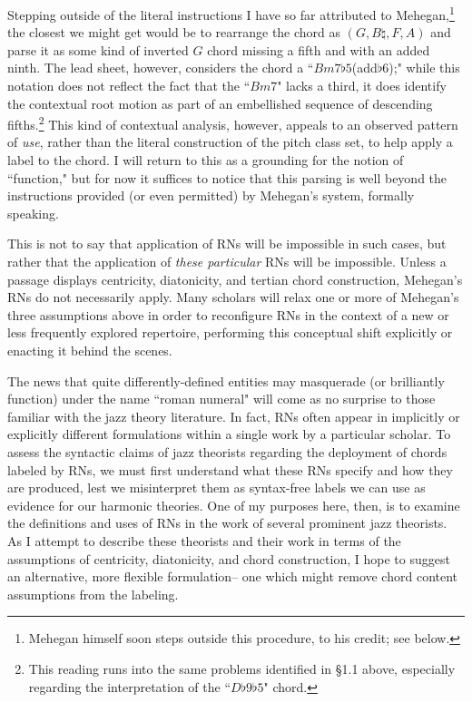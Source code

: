 Stepping outside of the literal instructions I have so far attributed to Mehegan,\footnote{Mehegan himself soon steps outside this procedure, to his credit; see below.} the closest we might get would be to rearrange the chord as $(G, B\natural, F, A)$ and parse it as some kind of inverted $G$ chord missing a fifth and with an added ninth.  The lead sheet, however, considers the chord a ``$Bm7\flat 5$(add$\flat 6$);" while this notation does not reflect the fact that the ``$Bm7$" lacks a third, it does identify the contextual root motion as part of an embellished sequence of descending fifths.\footnote{This reading runs into the same problems identified in \S 1.1 above, especially regarding the interpretation of the ``$D\flat 9 \flat 5$" chord.}  This kind of contextual analysis, however, appeals to an observed pattern of \emph{use}, rather than the literal construction of the pitch class set, to help apply a label to the chord.  I will return to this as a grounding for the notion of ``function," but for now it suffices to notice that this parsing is well beyond the instructions provided (or even permitted) by Mehegan's system, formally speaking.

This is not to say that application of RNs will be impossible in such cases, but rather that the application of \emph{these particular} RNs will be impossible.  Unless a passage displays centricity, diatonicity, and tertian chord construction, Mehegan's RNs do not necessarily apply.  Many scholars will relax one or more of Mehegan's three assumptions above in order to reconfigure RNs in the context of a new or less frequently explored repertoire, performing this conceptual shift explicitly or enacting it behind the scenes.

The news that quite differently-defined entities may masquerade (or brilliantly function) under the name ``roman numeral" will come as no surprise to those familiar with the jazz theory literature.  In fact, RNs often appear in implicitly or explicitly different formulations within a single work by a particular scholar.  To assess the syntactic claims of jazz theorists regarding the deployment of chords labeled by RNs, we must first understand what these RNs specify and how they are produced, lest we misinterpret them as syntax-free labels we can use as evidence for our harmonic theories.  One of my purposes here, then, is to examine the definitions and uses of RNs in the work of several prominent jazz theorists.  As I attempt to describe these theorists and their work in terms of the assumptions of centricity, diatonicity, and chord construction, I hope to suggest an alternative, more flexible formulation-- one which might remove chord content assumptions from the labeling.

